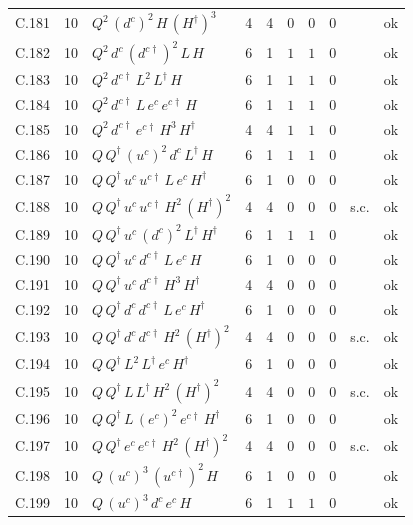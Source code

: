 {\begin{longtable}{@{}ll>{\raggedright\arraybackslash}p{6.4cm}rrllllr@{}}
C.181 & 10 & $Q^{2}\,(d^c)^{2}\,H\,(H^\dagger)^{3}$ & 4 & 4 & $0$ & $0$ & $0$ &  & ok \\
C.182 & 10 & $Q^{2}\,d^c\,(d^{c\dagger})^{2}\,L\,H$ & 6 & 1 & $1$ & $1$ & $0$ &  & ok \\
C.183 & 10 & $Q^{2}\,d^{c\dagger}\,L^{2}\,L^\dagger\,H$ & 6 & 1 & $1$ & $1$ & $0$ &  & ok \\
C.184 & 10 & $Q^{2}\,d^{c\dagger}\,L\,e^c\,e^{c\dagger}\,H$ & 6 & 1 & $1$ & $1$ & $0$ &  & ok \\
C.185 & 10 & $Q^{2}\,d^{c\dagger}\,e^{c\dagger}\,H^{3}\,H^\dagger$ & 4 & 4 & $1$ & $1$ & $0$ &  & ok \\
C.186 & 10 & $Q\,Q^\dagger\,(u^c)^{2}\,d^c\,L^\dagger\,H$ & 6 & 1 & $1$ & $1$ & $0$ &  & ok \\
C.187 & 10 & $Q\,Q^\dagger\,u^c\,u^{c\dagger}\,L\,e^c\,H^\dagger$ & 6 & 1 & $0$ & $0$ & $0$ &  & ok \\
C.188 & 10 & $Q\,Q^\dagger\,u^c\,u^{c\dagger}\,H^{2}\,(H^\dagger)^{2}$ & 4 & 4 & $0$ & $0$ & $0$ & s.c. & ok \\
C.189 & 10 & $Q\,Q^\dagger\,u^c\,(d^c)^{2}\,L^\dagger\,H^\dagger$ & 6 & 1 & $1$ & $1$ & $0$ &  & ok \\
C.190 & 10 & $Q\,Q^\dagger\,u^c\,d^{c\dagger}\,L\,e^c\,H$ & 6 & 1 & $0$ & $0$ & $0$ &  & ok \\
C.191 & 10 & $Q\,Q^\dagger\,u^c\,d^{c\dagger}\,H^{3}\,H^\dagger$ & 4 & 4 & $0$ & $0$ & $0$ &  & ok \\
C.192 & 10 & $Q\,Q^\dagger\,d^c\,d^{c\dagger}\,L\,e^c\,H^\dagger$ & 6 & 1 & $0$ & $0$ & $0$ &  & ok \\
C.193 & 10 & $Q\,Q^\dagger\,d^c\,d^{c\dagger}\,H^{2}\,(H^\dagger)^{2}$ & 4 & 4 & $0$ & $0$ & $0$ & s.c. & ok \\
C.194 & 10 & $Q\,Q^\dagger\,L^{2}\,L^\dagger\,e^c\,H^\dagger$ & 6 & 1 & $0$ & $0$ & $0$ &  & ok \\
C.195 & 10 & $Q\,Q^\dagger\,L\,L^\dagger\,H^{2}\,(H^\dagger)^{2}$ & 4 & 4 & $0$ & $0$ & $0$ & s.c. & ok \\
C.196 & 10 & $Q\,Q^\dagger\,L\,(e^c)^{2}\,e^{c\dagger}\,H^\dagger$ & 6 & 1 & $0$ & $0$ & $0$ &  & ok \\
C.197 & 10 & $Q\,Q^\dagger\,e^c\,e^{c\dagger}\,H^{2}\,(H^\dagger)^{2}$ & 4 & 4 & $0$ & $0$ & $0$ & s.c. & ok \\
C.198 & 10 & $Q\,(u^c)^{3}\,(u^{c\dagger})^{2}\,H$ & 6 & 1 & $0$ & $0$ & $0$ &  & ok \\
C.199 & 10 & $Q\,(u^c)^{3}\,d^c\,e^c\,H$ & 6 & 1 & $1$ & $1$ & $0$ &  & ok \\

\end{longtable}}
